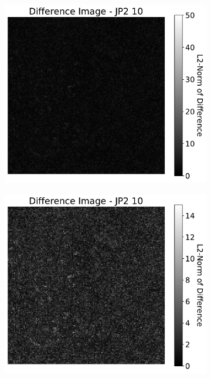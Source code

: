 \begin{figure}[htb]
\begin{subfigure}[b]{0.48\textwidth}
        \caption{}
        \label{fig:img_quality_comp_jp2_10_center_histo}
    \end{subfigure}
    \\
    \begin{subfigure}[b]{0.48\textwidth}
        \centering
        \includegraphics[width=\textwidth]{doc/thesis/0_figures/compare_quality/set1/jp2_10_center_diff_heatmap}
        \caption{}
        \label{fig:img_quality_comp_jp2_10_center_diff}
    \end{subfigure}
    \begin{subfigure}[b]{0.48\textwidth}
        \centering
        \includegraphics[width=\textwidth]{doc/thesis/0_figures/compare_quality/set1/jp2_10_center_diff_heatmap_rel}

\end{subfigure}
\end{figure}

